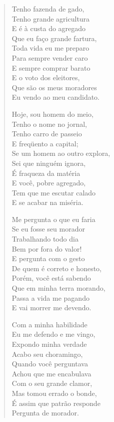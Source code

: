 \begin{verse}
Tenho fazenda de gado,\\
Tenho grande agricultura\\
E é à custa do agregado\\
Que eu faço grande fartura,\\
Toda vida eu me preparo\\
Para sempre vender caro\\
E sempre comprar barato\\
E o voto dos eleitores,\\
Que são os meus moradores\\
Eu vendo ao meu candidato.

Hoje, sou homem do meio,\\
Tenho o nome no jornal,\\
Tenho carro de passeio\\
E freqüento a capital;\\
Se um homem ao outro explora,\\
Sei que ninguém ignora,\\
É fraqueza da matéria\\
E você, pobre agregado,\\
Tem que me escutar calado\\
E se acabar na miséria.

Me pergunta o que eu faria\\
Se eu fosse seu morador\\
Trabalhando todo dia\\
Bem por fora do valor!\\
E pergunta com o gesto\\
De quem é correto e honesto,\\
Porém, você está sabendo\\
Que em minha terra morando,\\
Passa a vida me pagando\\
E vai morrer me devendo.

Com a minha habilidade\\
Eu me defendo e me vingo,\\
Expondo minha verdade\\
Acabo seu choramingo,\\
Quando você perguntava\\
Achou que me encabulava\\
Com o seu grande clamor,\\
Mas tomou errado o bonde,\\
É assim que patrão responde\\
Pergunta de morador.
\end{verse}

